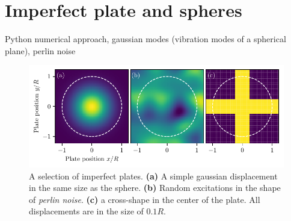 \section{Imperfect plate and spheres}
\label{sec:3:imperfect-plates}

Python numerical approach, gaussian modes (vibration modes of a spherical plane), perlin noise

\begin{figure}[!htbp]
  \centering
  \includegraphics[width=\textwidth]{../figures/casimir/imperfect-plates.pdf}
  \caption{A selection of imperfect plates. \textbf{(a)} A simple gaussian displacement in the same size as the sphere. \textbf{(b)} Random excitations in the shape of \textit{perlin noise}. \textbf{(c)} a cross-shape in the center of the plate. All displacements are in the size of $0.1R$.}
  \label{fig:3:imperfect-plates}
\end{figure}

